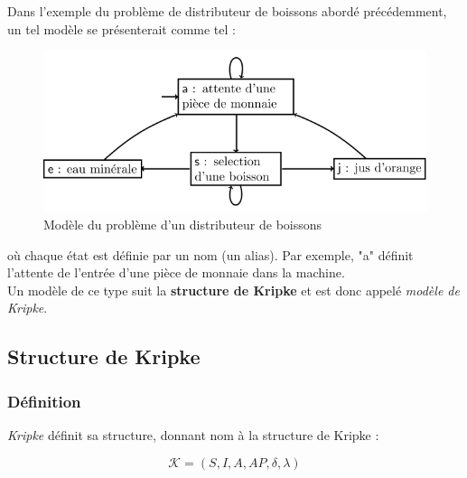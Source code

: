 \documentclass[runningheads,a4paper,10pt]{llncs}
\begin{document}
Dans l'exemple du problème de distributeur de boissons abordé précédemment, un tel modèle se présenterait comme tel : 

\begin{figure}
  \centering
   \includegraphics[scale=0.5]{figures/model-boissons.png}
   \caption[Caption for LOF]{Modèle du problème d'un distributeur de boissons\protect\footnotemark}
   \label{fig:model_boissons_1}
\end{figure}


\noindent
où chaque état est définie par un nom (un alias). Par exemple, "a" définit l'attente de l'entrée d'une pièce de monnaie dans la machine. \\

Un modèle de ce type suit la \textbf{structure de Kripke} et est donc appelé \textit{modèle de Kripke}. 

\newpage 

\subsection{Structure de Kripke} \label{sec:kripke}

\subsubsection{Définition} 

\textit{Kripke} définit sa structure, donnant nom à la structure de Kripke \cite{Kripke} : 

$$\boxed{\mathcal{K} = (S,I,A,AP,\delta,\lambda)}$$ 
\end{document}
